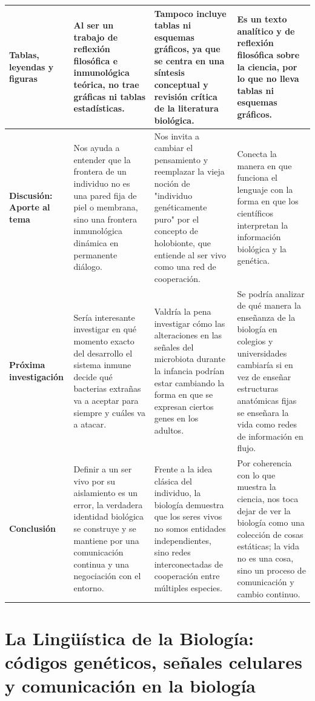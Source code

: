 \documentclass[12pt]{article}
\begin{document}
\begin{longtable}{|>{\raggedright\arraybackslash}p{3cm}|>{\raggedright\arraybackslash}p{4.2cm}|>{\raggedright\arraybackslash}p{4.2cm}|>{\raggedright\arraybackslash}p{4.2cm}|}
\hline
\textbf{Tablas, leyendas y figuras} & Al ser un trabajo de reflexión filosófica e inmunológica teórica, no trae gráficas ni tablas estadísticas. & Tampoco incluye tablas ni esquemas gráficos, ya que se centra en una síntesis conceptual y revisión crítica de la literatura biológica. & Es un texto analítico y de reflexión filosófica sobre la ciencia, por lo que no lleva tablas ni esquemas gráficos. \\
\hline
\textbf{Discusión: Aporte al tema} & Nos ayuda a entender que la frontera de un individuo no es una pared fija de piel o membrana, sino una frontera inmunológica dinámica en permanente diálogo. & Nos invita a cambiar el pensamiento y reemplazar la vieja noción de "individuo genéticamente puro" por el concepto de holobionte, que entiende al ser vivo como una red de cooperación. & Conecta la manera en que funciona el lenguaje con la forma en que los científicos interpretan la información biológica y la genética. \\
\hline
\textbf{Próxima investigación} & Sería interesante investigar en qué momento exacto del desarrollo el sistema inmune decide qué bacterias extrañas va a aceptar para siempre y cuáles va a atacar. & Valdría la pena investigar cómo las alteraciones en las señales del microbiota durante la infancia podrían estar cambiando la forma en que se expresan ciertos genes en los adultos. & Se podría analizar de qué manera la enseñanza de la biología en colegios y universidades cambiaría si en vez de enseñar estructuras anatómicas fijas se enseñara la vida como redes de información en flujo. \\
\hline
\textbf{Conclusión} & Definir a un ser vivo por su aislamiento es un error, la verdadera identidad biológica se construye y se mantiene por una comunicación continua y una negociación con el entorno. & Frente a la idea clásica del individuo, la biología demuestra que los seres vivos no somos entidades independientes, sino redes interconectadas de cooperación entre múltiples especies. & Por coherencia con lo que muestra la ciencia, nos toca dejar de ver la biología como una colección de cosas estáticas; la vida no es una cosa, sino un proceso de comunicación y cambio continuo. \\
\hline
\end{longtable}

\newpage

\section*{La Lingüística de la Biología: códigos genéticos, señales celulares y comunicación en la biología}
\end{document}
